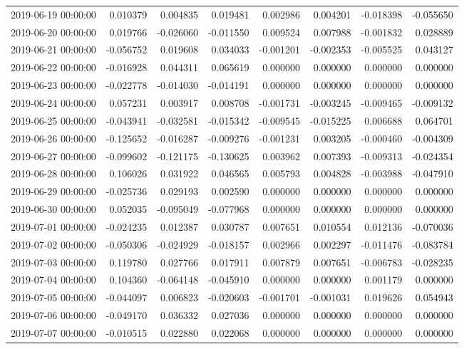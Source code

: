 \begin{tabular}{lrrrrrrr}
2019-06-19 00:00:00 & 0.010379 & 0.004835 & 0.019481 & 0.002986 & 0.004201 & -0.018398 & -0.055650 \\
2019-06-20 00:00:00 & 0.019766 & -0.026060 & -0.011550 & 0.009524 & 0.007988 & -0.001832 & 0.028889 \\
2019-06-21 00:00:00 & -0.056752 & 0.019608 & 0.034033 & -0.001201 & -0.002353 & -0.005525 & 0.043127 \\
2019-06-22 00:00:00 & -0.016928 & 0.044311 & 0.065619 & 0.000000 & 0.000000 & 0.000000 & 0.000000 \\
2019-06-23 00:00:00 & -0.022778 & -0.014030 & -0.014191 & 0.000000 & 0.000000 & 0.000000 & 0.000000 \\
2019-06-24 00:00:00 & 0.057231 & 0.003917 & 0.008708 & -0.001731 & -0.003245 & -0.009465 & -0.009132 \\
2019-06-25 00:00:00 & -0.043941 & -0.032581 & -0.015342 & -0.009545 & -0.015225 & 0.006688 & 0.064701 \\
2019-06-26 00:00:00 & -0.125652 & -0.016287 & -0.009276 & -0.001231 & 0.003205 & -0.000460 & -0.004309 \\
2019-06-27 00:00:00 & -0.099602 & -0.121175 & -0.130625 & 0.003962 & 0.007393 & -0.009313 & -0.024354 \\
2019-06-28 00:00:00 & 0.106026 & 0.031922 & 0.046565 & 0.005793 & 0.004828 & -0.003988 & -0.047910 \\
2019-06-29 00:00:00 & -0.025736 & 0.029193 & 0.002590 & 0.000000 & 0.000000 & 0.000000 & 0.000000 \\
2019-06-30 00:00:00 & 0.052035 & -0.095049 & -0.077968 & 0.000000 & 0.000000 & 0.000000 & 0.000000 \\
2019-07-01 00:00:00 & -0.024235 & 0.012387 & 0.030787 & 0.007651 & 0.010554 & 0.012136 & -0.070036 \\
2019-07-02 00:00:00 & -0.050306 & -0.024929 & -0.018157 & 0.002966 & 0.002297 & -0.011476 & -0.083784 \\
2019-07-03 00:00:00 & 0.119780 & 0.027766 & 0.017911 & 0.007879 & 0.007651 & -0.006783 & -0.028235 \\
2019-07-04 00:00:00 & 0.104360 & -0.064148 & -0.045910 & 0.000000 & 0.000000 & 0.001179 & 0.000000 \\
2019-07-05 00:00:00 & -0.044097 & 0.006823 & -0.020603 & -0.001701 & -0.001031 & 0.019626 & 0.054943 \\
2019-07-06 00:00:00 & -0.049170 & 0.036332 & 0.027036 & 0.000000 & 0.000000 & 0.000000 & 0.000000 \\
2019-07-07 00:00:00 & -0.010515 & 0.022880 & 0.022068 & 0.000000 & 0.000000 & 0.000000 & 0.000000 \\

\end{tabular}
